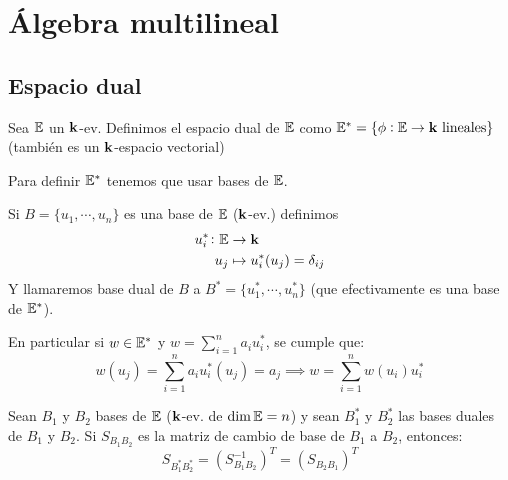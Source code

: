 \chapter{Álgebra multilineal}




\section{Espacio dual}

\begin{defi}
	Sea $\mathbb{E}$ un $\mathbf{k}$-ev. Definimos el espacio dual de $\mathbb{E}$ como
	$\mathbb{E}^* = \{ \phi : \mathbb{E} \to \mathbf{k} \text{ lineales} \}$ (también es un
	$\mathbf{k}$-espacio vectorial)
\end{defi}
\begin{obs}
	Para definir $\mathbb{E}^*$ tenemos que usar bases de $\mathbb{E}$.
\end{obs}
\begin{defi}
	Si $B = \{ u_1,\cdots, u_n \}$ es una base de $\mathbb{E}$ ($\mathbf{k}$-ev.)
	definimos
	\[
		\begin{aligned}
			u_i^* \colon \mathbb{E} &\to \mathbf{k}\\
			u_j &\mapsto u_i^*(u_j) = \delta_{ij}
		\end{aligned}
	\]
	Y llamaremos base dual de $B$ a
	$B^* = \{ u_1^*, \cdots, u_n^* \}$ (que efectivamente es una
	base de $\mathbb{E}^*$).
\end{defi}
\begin{obs}
	En particular si $w \in \mathbb{E}^*$ y
	$\displaystyle w = \sum_{i=1}^{n} a_i u_i^*$, se cumple que:
	\[
		w(u_j) = \sum_{i=1}^{n} a_i u_i^*(u_j) = a_j
		\implies
		w = \sum_{i=1}^{n}w(u_i)u_i^*
	\]
\end{obs}

\begin{prop}
	Sean $B_1$ y $B_2$ bases de $\mathbb{E}$ ($\mathbf{k}$-ev. de $\dim  \mathbb{E} = n$) y
	sean $B_1^*$ y $B_2^*$ las bases duales de $B_1$ y $B_2$.
	Si $S_{B_1B_2}$ es la matriz de cambio de base de $B_1$ a
	$B_2$, entonces:
	\[
		S_{B_1^*B_2^*} = (S_{B_1B_2}^{-1})^T = (S_{B_2B_1})^T
	\]
\end{prop}

